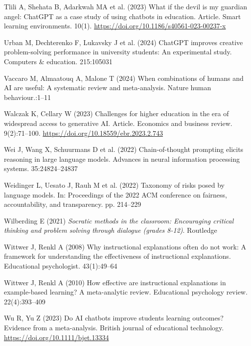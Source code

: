 \documentclass[
  11pt,
]{article}
\newlength{\cslhangindent}
\newenvironment{CSLReferences}[2] %
 {\begin{list}{}{%
  \setlength{\itemindent}{0pt}
  \setlength{\leftmargin}{0pt}
  \setlength{\parsep}{0pt}
  \ifodd #1
   \setlength{\leftmargin}{\cslhangindent}
   \setlength{\itemindent}{-1\cslhangindent}
  \fi
  \setlength{\itemsep}{#2\baselineskip}}}
 {\end{list}}
\begin{document}
\begin{CSLReferences}{1}{0}
Tlili A, Shehata B, Adarkwah MA et al. (2023) What if the devil is my guardian angel: ChatGPT as a case study of using chatbots in education. Article. Smart learning environments. 10(1). \url{https://doi.org/10.1186/s40561-023-00237-x}

Urban M, Dechterenko F, Lukavsky J et al. (2024) ChatGPT improves creative problem-solving performance in university students: An experimental study. Computers \& education. 215:105031

Vaccaro M, Almaatouq A, Malone T (2024) When combinations of humans and AI are useful: A systematic review and meta-analysis. Nature human behaviour.:1--11

Walczak K, Cellary W (2023) Challenges for higher education in the era of widespread access to generative AI. Article. Economics and business review. 9(2):71--100. \url{https://doi.org/10.18559/ebr.2023.2.743}

Wei J, Wang X, Schuurmans D et al. (2022) Chain-of-thought prompting elicits reasoning in large language models. Advances in neural information processing systems. 35:24824--24837

Weidinger L, Uesato J, Rauh M et al. (2022) Taxonomy of risks posed by language models. In: Proceedings of the 2022 ACM conference on fairness, accountability, and transparency. pp. 214--229

Wilberding E (2021) \emph{Socratic methods in the classroom: Encouraging critical thinking and problem solving through dialogue (grades 8-12)}. Routledge

Wittwer J, Renkl A (2008) Why instructional explanations often do not work: A framework for understanding the effectiveness of instructional explanations. Educational psychologist. 43(1):49--64

Wittwer J, Renkl A (2010) How effective are instructional explanations in example-based learning? A meta-analytic review. Educational psychology review. 22(4):393--409

Wu R, Yu Z (2023) Do AI chatbots improve students learning outcomes? Evidence from a meta-analysis. British journal of educational technology. \url{https://doi.org/10.1111/bjet.13334}


\end{CSLReferences}
\end{document}
